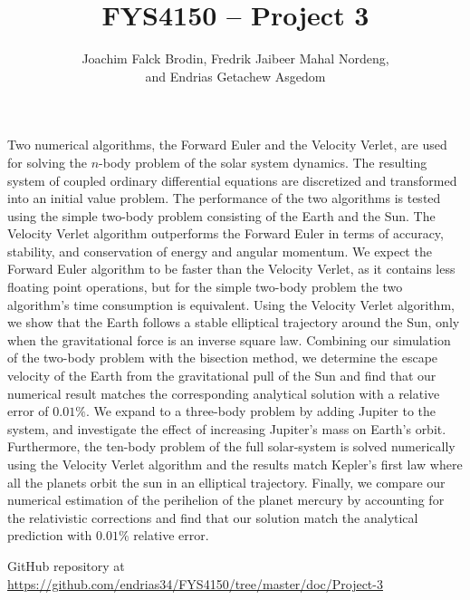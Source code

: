 \documentclass[a4paper]{article}
\begin{document}
\title{FYS4150 -- Project 3}
\author{Joachim Falck Brodin,
        Fredrik Jaibeer Mahal Nordeng,\\ 
        and Endrias Getachew Asgedom}

\maketitle
\begin{abstract}
\noindent
\end{abstract}
Two numerical algorithms, the Forward Euler and the Velocity Verlet, are used for solving the $n$-body problem of the solar system dynamics. The resulting system of coupled ordinary differential equations are discretized and transformed into an initial value problem. The performance of the two algorithms is tested using the simple two-body problem consisting of the Earth and the Sun. The Velocity Verlet algorithm outperforms the Forward Euler in terms of accuracy, stability, and conservation of energy and angular momentum. We expect the Forward Euler algorithm to be faster than the Velocity Verlet, as it contains less floating point operations, but for the simple two-body problem the two algorithm's time consumption is equivalent. Using the Velocity Verlet algorithm, we show that the Earth follows a stable elliptical trajectory around the Sun, only when the gravitational force is an inverse square law. Combining our simulation of the two-body problem with the bisection method, we determine the escape velocity of the Earth from the gravitational pull of the Sun and find that our numerical result matches the corresponding analytical solution with a relative error of $0.01\%$. We expand to a three-body problem by adding Jupiter to the system, and investigate the effect of increasing Jupiter's mass on Earth's orbit. Furthermore, the ten-body problem of the full solar-system is solved numerically using the Velocity Verlet algorithm and the results match Kepler's first law where all the planets orbit the sun in an elliptical trajectory. Finally, we compare our numerical estimation of the perihelion of the planet mercury by accounting for the relativistic corrections and find  that our solution match the analytical prediction with $0.01\%$ relative error.


\newpage
\tableofcontents

\begin{center}
    GitHub repository at \url{https://github.com/endrias34/FYS4150/tree/master/doc/Project-3}
\end{center}
\newcommand{\half}{\frac{1}{2}}
\newcommand{\dx}{{\Delta x}}
\newcommand{\bigO}{{\mathcal{O}}}
\end{document}
